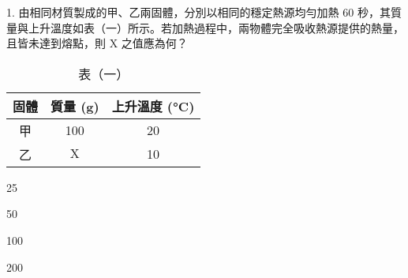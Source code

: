 \documentclass[12pt]{article}
\begin{document}
\begin{problem}
  \item[1.] 由相同材質製成的甲、乙兩固體，分別以相同的穩定熱源均勻加熱 $60$ 秒，其質量與上升溫度如表（一）所示。若加熱過程中，兩物體完全吸收熱源提供的熱量，且皆未達到熔點，則 $\mathrm{X}$ 之值應為何？
  \begin{table}[ht]
    \centering
    \renewcommand{\arraystretch}{1.2}
    \vspace*{-1ex}
    \caption*{表（一）}
    \vspace*{-1ex}
    \begin{tabular}{|c|c|c|}
      \hline
      固體 & 質量 (\unit{\gram}) & 上升溫度 (\unit{\degreeCelsius}) \\ \hline
      甲 & 100 & 20 \\ \hline
      乙 & $\mathrm{X}$ & 10 \\ \hline
    \end{tabular}
    \vspace*{-2ex}
  \end{table}
  \begin{choices}
    \item 25
    \item 50
    \item 100
    \item 200
  \end{choices}
\end{problem}
\end{document}
